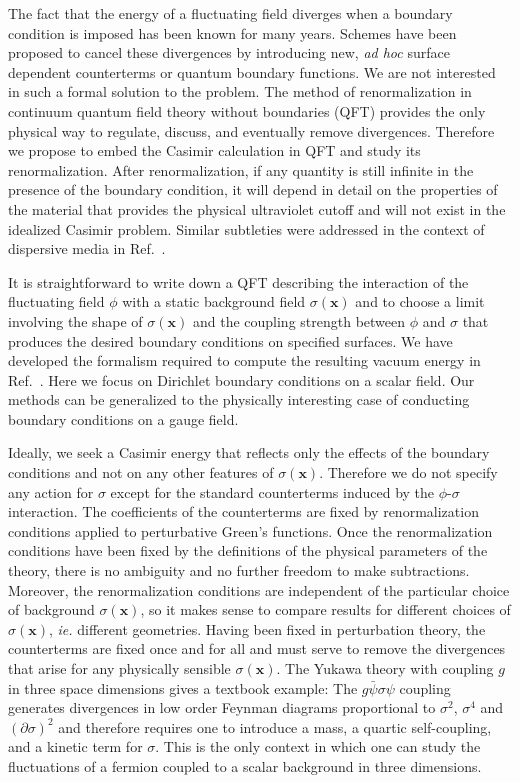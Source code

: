 \documentclass[a4paper,aps,amsfonts,prl,showpacs,nobibnotes,nofootinbib,%
tightenlines,twocolumn]{revtex4}
\newcommand{\vek}[1]{\mathbf{#1}}
\begin{document}
The fact that the energy of a fluctuating field diverges when a
boundary condition is imposed has been known for many years\cite{C&D,
Candelas}.  Schemes have been proposed to cancel these divergences by
introducing new, {\it ad hoc\/} surface dependent
counterterms\cite{Symanzik} or quantum boundary functions\cite{Actor}. 
We are not interested in such a formal solution to the problem. The
method of renormalization in continuum quantum field theory
without boundaries (QFT) provides the only physical way to
regulate, discuss, and eventually remove divergences.  Therefore we
propose to embed the Casimir calculation in QFT and study its
renormalization.  After renormalization, if any quantity is still
infinite in the presence of the boundary condition, it will depend in
detail on the properties of the material that provides the physical
ultraviolet cutoff and will not exist in the idealized Casimir
problem.  Similar subtleties were addressed in the context of
dispersive media in Ref.~\cite{Barton}.

It is straightforward to write down a QFT describing the interaction
of the fluctuating field $\phi$ with a static background field
$\sigma(\vek x)$ and to choose a limit involving the shape of
$\sigma(\vek x)$ and the coupling strength between $\phi$ and $\sigma$
that produces the desired boundary conditions on specified surfaces. 
We have developed the formalism required to compute the resulting
vacuum energy in Ref.~\cite{dens}.   Here we focus on Dirichlet
boundary conditions on a scalar field.  Our methods can be generalized
to the physically interesting case of conducting boundary conditions
on a gauge field.

Ideally, we seek a Casimir energy that reflects only the effects
of the boundary conditions and not on any other features of
$\sigma(\vek x)$.  Therefore we do not specify any action for $\sigma$
except for the standard counterterms induced by the $\phi$-$\sigma$
interaction.  The coefficients of the counterterms are fixed by
renormalization conditions applied to perturbative Green's functions. 
Once the renormalization conditions have been fixed by the
definitions of the physical parameters of the theory, there is no
ambiguity and no further freedom to make subtractions. Moreover, the
renormalization conditions are independent of the particular choice of
background $\sigma(\vek x)$, so it makes sense to compare results
for different choices of $\sigma(\vek x)$, {\it ie.\/} different
geometries.  Having been fixed in perturbation theory, the
counterterms are fixed once and for all and must serve to remove the
divergences that arise for any physically sensible $\sigma(\vek x)$. 
The Yukawa theory with coupling $g$ in three space dimensions gives a
textbook example: The $g\bar\psi\sigma\psi$ coupling generates
divergences in low order Feynman diagrams proportional to
$\sigma^{2}$, $\sigma^{4}$ and $(\partial\sigma)^2$ and therefore
requires one to introduce a mass, a quartic self-coupling, and a
kinetic term for $\sigma$.  This is the only context in which one can
study the fluctuations of a fermion coupled to a scalar background in
three dimensions.
\end{document}
